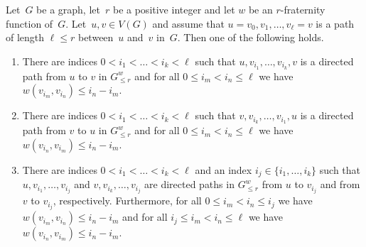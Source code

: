 \documentclass[10pt,a4paper]{amsart}
\begin{document}
\begin{lemma}\label{thm:augmentationneighborhood}
  Let~$G$ be a graph, let~$r$ be a positive integer and 
  let $w$ be an $r$-fraternity function of~$G$.  
  Let~$u,v\in V(G)$
  and assume that \mbox{$u=v_0, v_1,\ldots, v_\ell=v$} is a path of
  length $\ell\leq r$ between~$u$ and~$v$ in~$G$. Then 
  one of the following holds. 
  \begin{enumerate}
	\item There are indices $0< i_1<\ldots<i_k< \ell$ 
	such that $u,v_{i_1}, \ldots, v_{i_k},v$ is a directed 
	path from $u$ to $v$ in $G^w_{\leq r}$ and for all 
  $0\leq i_m<i_n\leq \ell$ we have $w(v_{i_m}, v_{i_n})\leq 
  i_n-i_m$.
    \item There are indices $0< i_1<\ldots<i_k< \ell$ 
	such that $v,v_{i_k}, \ldots, v_{i_1},u$ is a directed 
	path from $v$ to $u$ in $G^w_{\leq r}$ and for all 
  $0\leq i_m<i_n\leq \ell$ we have $w(v_{i_n}, v_{i_m})\leq 
  i_n-i_m$.
    \item There are indices $0< i_1<\ldots<i_k< \ell$ and 
    an index $i_j\in \{i_1,\ldots, i_k\}$ such that 
    $u, v_{i_1},\ldots, v_{i_j}$ and $v, v_{i_k},\ldots, v_{i_j}$
    are directed paths in $G^w_{\leq r}$ from $u$ to $v_{i_j}$ and from 
    $v$ to $v_{i_j}$, respectively. Furthermore, for all 
  $0\leq i_m<i_n\leq i_j$ we have $w(v_{i_m}, v_{i_n})\leq 
  i_n-i_m$ and for all 
  $i_j\leq i_m<i_n\leq \ell$ we have $w(v_{i_n}, v_{i_m})\leq 
  i_n-i_m$.
  \end{enumerate}
\end{lemma}
\end{document}
